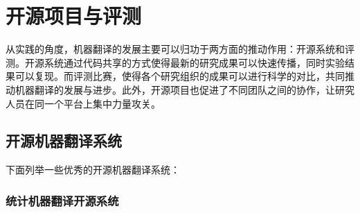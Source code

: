 \section{开源项目与评测}

\parinterval 从实践的角度，机器翻译的发展主要可以归功于两方面的推动作用：开源系统和评测。开源系统通过代码共享的方式使得最新的研究成果可以快速传播，同时实验结果可以复现。而评测比赛，使得各个研究组织的成果可以进行科学的对比，共同推动机器翻译的发展与进步。此外，开源项目也促进了不同团队之间的协作，让研究人员在同一个平台上集中力量攻关。


\subsection{开源机器翻译系统}


下面列举一些优秀的开源机器翻译系统：


\subsubsection{统计机器翻译开源系统}

